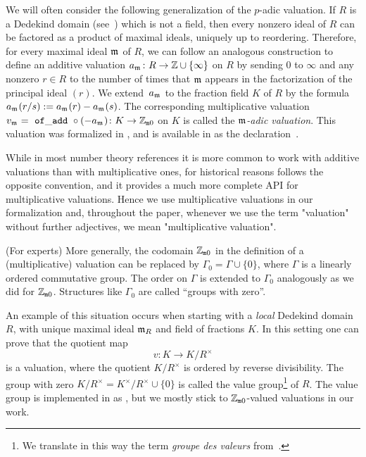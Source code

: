 \documentclass[sigplan,10pt, nonacm, review]{acmart}
\begin{document}
\begin{example}\label{example:adic_valuation}
We will often consider the following generalization of the $p$-adic valuation. If $R$ is a Dedekind domain (see~\cite[Chapitre~VII, \S2]{Bou85}) which is not a field, then every nonzero ideal of $R$ can be factored as a product of maximal ideals, uniquely up to reordering. Therefore, for every maximal ideal $\maxid[\empty]$ of $R$, we can follow an analogous construction to define an additive valuation $\av[{\maxid[\empty]}] \colon R \to \ZZ \cup \{ \infty\}$ on $R$ by sending $0$ to $\infty$ and any nonzero $r \in R$ to the number of times that $\mathfrak{m}$ appears in the factorization of the principal ideal $(r)$. We extend~$\av[{\maxid[\empty]}]$ to the fraction field $K$ of $R$ by the formula $\av[{\maxid[\empty]}](r/s):=\av[{\maxid[\empty]}](r)-\av[{\maxid[\empty]}](s)$. The corresponding multiplicative valuation $v_{\maxid[\empty]}=\mcode{of\_add}\circ (-\av[{\maxid[\empty]}])\colon K \to \wzmZZ$ on $K$ is called the \emph{$\mathfrak{m}$-adic valuation}. This valuation was formalized in \cite{deF22}, and is available in \mathlib as the declaration~\href{https://leanprover-community.github.io/mathlib_docs/ring_theory/dedekind_domain/adic_valuation.html#is_dedekind_domain.height_one_spectrum.valuation}{\extlink}.
\end{example}

While in most number theory references it is more common to work with additive valuations than with multiplicative ones, for historical reasons \mathlib follows the opposite convention, and it provides a much more complete API for multiplicative valuations. Hence we use multiplicative valuations in our formalization and, throughout the paper, whenever we use the term "valuation" without further adjectives, we mean "multiplicative valuation".

\begin{remark}\label{rmk:value_group}(For experts)
More generally, the codomain $\mathbb{Z}_{\mathtt{m}0}$ in the definition of a (multiplicative) valuation can be replaced by $\Gamma_0=\Gamma\cup\{0\}$, where $\Gamma$ is a linearly ordered commutative group. The order on $\Gamma$ is extended to $\Gamma_0$ analogously as we did for $\mathbb{Z}_{\mathtt{m}0}$. Structures like $\Gamma_0$ are called ``groups with zero''.
    
An example of this situation occurs when starting with a \emph{local} Dedekind domain $R$, with unique maximal ideal $\mathfrak{m}_{R}$ and field of fractions $K$. In this setting one can prove that the quotient map
 \[
v \colon K\rightarrow K/R^\times
\]
is a valuation, where the quotient $K/R^\times$ is ordered by reverse divisibility. The group with zero $K/R^\times=K^\times/R^\times\cup\{0\}$ is called the value group\footnote{We translate in this way the term \emph{groupe des valeurs} from~\cite[Chapitre~VI, \S3, n$^\circ$2]{Bou85}.} of $R$. The value group is implemented in \mathlib as \href{https://leanprover-community.github.io/mathlib_docs/ring_theory/valuation/valuation_ring.html#valuation_ring.value_group}{\extlink}, but we mostly stick to $\mathbb{Z}_{\mathtt{m}0}$-valued valuations in our work.
\end{remark}
\end{document}

